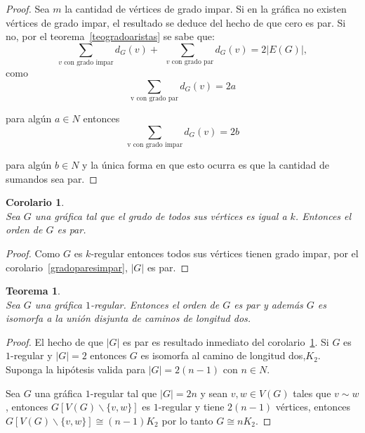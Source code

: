 \documentclass[12pt]{book}
\newtheorem{theorem}{Teorema}
\newtheorem{corollary}{Corolario}
\theoremstyle{definition}
\begin{document}
\begin{proof} Sea $m$ la cantidad de vértices de grado impar. Si en la
gráfica no existen vértices de grado impar, el resultado se deduce del
hecho de que cero es par. Si no, por el teorema~\ref{teogradoaristas}
se sabe que:
\begin{equation*}
  \sum_{\text{$v$ con grado impar}}d_G(v) + \sum_{\text { $v$ con grado par}}d_G(v)=2| E(G)|,
\end{equation*}
como \begin{equation*} \sum_{\text{v con grado par}}d_G(v)=2a
\end{equation*}

para algún $a\in N$ entonces
\begin{equation*}
  \sum_{\text {v con grado impar}}d_G(v)=2b
\end{equation*}

para algún $b\in N$ y la única forma en que esto ocurra es que la
cantidad de sumandos sea par.
\end{proof}

\begin{corollary}\textbf{}\\
  \label{cardinespar}
Sea $G$ una gráfica tal que el grado de todos sus vértices es igual a $k$. Entonces el orden de $G$ es par.
\end{corollary}

\begin{proof} Como $G$ es $k$-regular entonces todos sus vértices
tienen grado impar, por el corolario~\ref{gradoparesimpar}, $|G|$ es
par.
\end{proof}

\begin{theorem}\textbf{}\\
  Sea $G$ una gráfica $1$-regular. Entonces el orden de $G$ es par y además $G$ es isomorfa a la unión disjunta de caminos de longitud dos.
\end{theorem}

\begin{proof} El hecho de que $|G|$ es par es resultado inmediato del corolario~\ref{cardinespar}. Si $G$ es $1$-regular y $|G|=2$
entonces $G$ es isomorfa al camino de longitud dos,$K_2$. Suponga la hipótesis valida para $|G|=
2(n-1)$ con $n\in N$.

Sea $G$ una gráfica $1$-regular tal que $|G|=2n$ y sean $v,w\in V(G)$
tales que $v \sim w$, entonces $G[ V(G)\backslash\{v,w\}]$ es
$1$-regular y tiene $2(n-1)$ vértices, entonces $G[ V(G)\backslash
\{v,w\}]\cong (n-1)K_2$ por lo tanto $G\cong nK_2$.
\end{proof}
\end{document}
